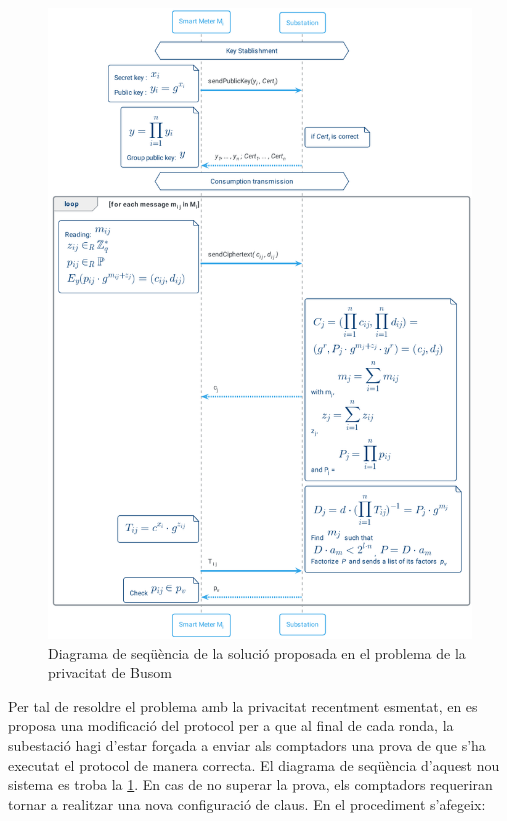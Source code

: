 \begin{figure}[H]
	\centering
	\includegraphics[width=13cm]{umls/garra.png}
	\caption{Diagrama de seqüència de la solució proposada en el problema de la privacitat de Busom}
	\label{fig:garra}
\end{figure}
\newpage
Per tal de resoldre el problema amb la privacitat recentment esmentat, en \cite{repair-busom} es proposa una modificació del protocol per a que al final de cada ronda, la subestació hagi d'estar forçada a enviar als comptadors una prova de que s'ha executat el protocol de manera correcta. El diagrama de seqüència d'aquest nou sistema es troba la \cref{fig:garra}. En cas de no superar la prova, els comptadors requeriran tornar a realitzar una nova configuració de claus. En el procediment s'afegeix:

